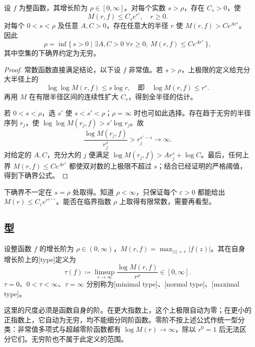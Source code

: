 \begin{proposition}[阶与指数增长尺度]\label{b3:prop:19-growth-scales}
设 \(f\) 为整函数，其增长阶为 \(\rho\in[0,\infty]\)。对每个实数 \(s>\rho\)，存在 \(C_s>0\)，使
\[
 M(r,f)\le C_s e^{r^s},\quad r\ge0.
\]
对每个 \(0<s<\rho\) 及任意 \(A,C>0\)，存在任意大的半径 \(r\) 使 \(M(r,f)>C e^{Ar^s}\)。因此
\[
 \rho=\inf\bigl\{\,s>0\mid
 \exists A,C>0\ \forall r\ge0,\ M(r,f)\le C e^{Ar^s}\,\bigr\},
\]
其中空集的下确界约定为无穷。
\end{proposition}
\begin{proof}
常数函数直接满足结论，以下设 \(f\) 非常值。若 \(s>\rho\)，上极限的定义给充分大半径上的
\[
 \log\log M(r,f)\le s\log r,
 \quad\text{即}\quad \log M(r,f)\le r^s.
\]
再用 \(M\) 在有限半径区间的连续性扩大 \(C_s\)，得到全半径的估计。

若 \(0<s<\rho\)，选 \(s'\) 使 \(s<s'<\rho\)；\(\rho=\infty\) 时也可如此选择。存在趋于无穷的半径序列 \(r_j\)，使 \(\log\log M(r_j,f)>s'\log r_j\)。故
\[
 \frac{\log M(r_j,f)}{r_j^s}>r_j^{s'-s}\longrightarrow\infty.
\]
对给定的 \(A,C\)，充分大的 \(j\) 便满足 \(\log M(r_j,f)>A r_j^s+\log C\)。最后，任何上界 \(M(r,f)\le C e^{Ar^s}\) 都使双对数的上极限不超过 \(s\)；结合已经证明的严格阈值，得到下确界公式。
\end{proof}
下确界不一定在 \(s=\rho\) 处取得。知道 \(\rho<\infty\)，只保证每个 \(\varepsilon>0\) 都能给出 \(M(r)\le C_\varepsilon e^{r^{\rho+\varepsilon}}\)。能否在临界指数 \(\rho\) 上取得有限常数，需要再看型。

\subsection{型}
\label{b3:subsec:190202}

\begin{definition}\label{b3:def:19-type}
设整函数 \(f\) 的增长阶为 \(\rho\in(0,\infty)\)，\(M(r,f)=\max_{|z|=r}|f(z)|\)。其在自身增长阶上的[type]定义为
\[
 \tau(f)\coloneqq\limsup_{r\to\infty}
 \frac{\log M(r,f)}{r^\rho}\in[0,\infty].
\]
\(\tau=0\)、\(0<\tau<\infty\)、\(\tau=\infty\) 分别称为[minimal type]、[normal type]、[maximal type]。
\end{definition}
这里的尺度必须是函数自身的阶。在更大指数上，这个上极限自动为零；在更小的正指数上，它自动为无穷，均不能细分同阶函数。零阶不按上述公式作统一型分类：非常值多项式与超越零阶函数都有 \(\log M(r)\to\infty\)，除以 \(r^0=1\) 后无法区分它们。无穷阶也不属于此定义的范围。

